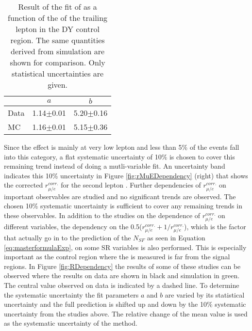 \begin{table}[ht!]
\def\arraystretch{1.2}
\setlength{\belowcaptionskip}{6pt} 
\small                            
\centering                           
\caption{Result of the fit of \rmue as a function of the \pt of the trailing lepton in the DY control region. The same quantities derived from simulation are shown for comparison. Only statistical uncertainties are given.}
\label{tab:rMuEFitParameters}
\begin{tabular}{ l c c }
        \hline \hline
    		& $a$ & $b$ \\\hline
        Data     &  1.14$\pm$0.01  &  5.20$\pm$0.16    \\
        MC       &  1.16$\pm$0.01  &  5.15$\pm$0.36    \\\hline\hline
\end{tabular}
\end{table}                                                                                                                                                                   
Since the effect is mainly at very low lepton \pt and less than 5\% of the events fall into this category, a flat systematic uncertainty of 10\% is chosen to cover this remaining trend 
instead of doing a mutli-variable fit. 
An uncertainty band indicates this 10\% uncertainty in Figure \ref{fig:rMuEDependency} (right) that shows the corrected $r_{\mu/e}^{corr.}$ for the second lepton \pt. 
Further dependencies of $r_{\mu/e}^{corr.}$ on important observables are studied and no significant trends are observed. 
The chosen 10\% systematic uncertainty is sufficient to cover any remaining trends in these observables.
In addition to the studies on the dependence of $r_{\mu/e}^{corr.}$ on different variables, the dependency on the 0.5($r_{\mu/e}^{corr.}+1/r_{\mu/e}^{corr.}$), which is the factor that actually go in to the prediction of the $N_{SF}$ as seen in Equation \ref{eq:masterformulaExp}, on some SR variables is also performed. 
This is especially important as the control region where the \rmue is measured is far from the signal regions. 
In Figure \ref{fig:RDependency} the results of some of these studies can be observed where the results on data are shown in black and simulation in green. 
The central value observed on data is indicated by a dashed line. 
To determine the systematic uncertainty the fit parameters $a$ and $b$ are varied by its statistical uncertainty and the full prediction is shifted up and down by the 10\% systematic uncertainty from the studies above.
The relative change of the mean value is used as the systematic uncertainty of the method. 
